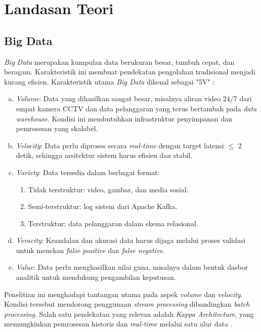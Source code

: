 \section{Landasan Teori}

\subsection{Big Data}

\textit{Big Data} merupakan kumpulan data berukuran besar, tumbuh cepat, dan
beragam. Karakteristik ini membuat pendekatan pengolahan tradisional menjadi
kurang efisien. Karakteristik utama \textit{Big Data} dikenal sebagai "5V"
\cite{marz2015big}:

\begin{enumerate}[a.]
  \item \textit{Volume}: Data yang dihasilkan sangat besar, misalnya aliran video 24/7 dari empat kamera CCTV dan data pelanggaran yang terus bertambah pada \textit{data warehouse}. Kondisi ini membutuhkan infrastruktur penyimpanan dan pemrosesan yang skalabel.

  \item \textit{Velocity}: Data perlu diproses secara \textit{real-time} dengan target latensi $\leq$ 2 detik, sehingga arsitektur sistem harus efisien dan stabil.

  \item \textit{Variety}: Data tersedia dalam berbagai format:
  \begin{enumerate}[1).]
    \item Tidak terstruktur: video, gambar, dan media sosial.
    \item Semi-terstruktur: log sistem dari Apache Kafka.
    \item Terstruktur: data pelanggaran dalam skema relasional.
  \end{enumerate}

\item \textit{Veracity}: Keandalan dan akurasi data harus dijaga melalui proses validasi untuk menekan \textit{false positive} dan \textit{false negative}.

\item \textit{Value}: Data perlu menghasilkan nilai guna, misalnya dalam bentuk dasbor analitik untuk mendukung pengambilan keputusan.
\end{enumerate}

Penelitian ini menghadapi tantangan utama pada aspek \textit{volume} dan
\textit{velocity}. Kondisi tersebut mendorong penggunaan
\textit{stream processing} dibandingkan \textit{batch processing}. Salah satu
pendekatan yang relevan adalah \textit{Kappa Architecture}, yang memungkinkan
pemrosesan historis dan \textit{real-time} melalui satu alur data
\cite{marz2015big}.

